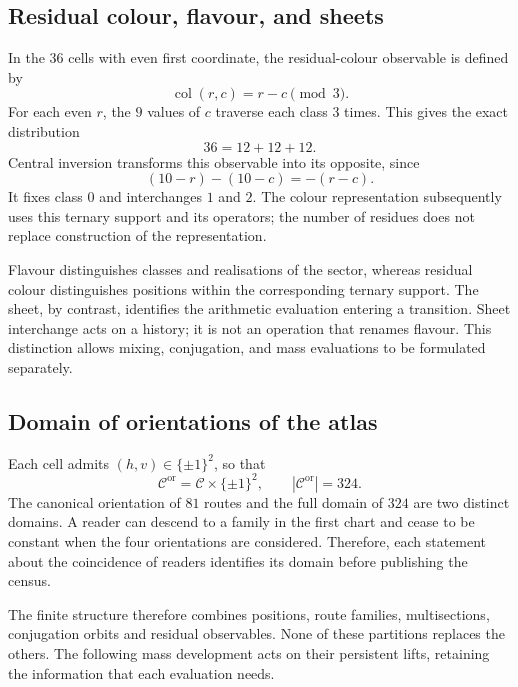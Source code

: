 \subsection{Residual colour, flavour, and sheets}

In the \(36\) cells with even first coordinate, the residual-colour
observable is defined by
\[
 \operatorname{col}(r,c)=r-c\pmod3.
\]
For each even \(r\), the \(9\) values of \(c\) traverse each class
\(3\) times. This gives the exact distribution
\[
 36=12+12+12.
\]
Central inversion transforms this observable into its opposite, since
\[
 (10-r)-(10-c)=-(r-c).
\]
It fixes class \(0\) and interchanges \(1\) and \(2\). The colour
representation subsequently uses this ternary support and its operators;
the number of residues does not replace construction of the representation.

Flavour distinguishes classes and realisations of the sector, whereas residual
colour distinguishes positions within the corresponding ternary support.
The sheet, by contrast, identifies the arithmetic evaluation entering
a transition. Sheet interchange acts on a history; it is not
an operation that renames flavour. This distinction allows
mixing, conjugation, and mass evaluations to be formulated
separately.

\subsection{Domain of orientations of the atlas}

Each cell admits \((h,v)\in\{\pm1\}^2\), so that
\[
 \mathcal C^{\mathrm{or}}=\mathcal C\times\{\pm1\}^2,
 \qquad |\mathcal C^{\mathrm{or}}|=324.
\]
The canonical orientation of \(81\) routes and the full domain of \(324\)
are two distinct domains. A reader can descend to a family in the
first chart and cease to be constant when the four
orientations are considered. Therefore, each statement about the coincidence of readers
identifies its domain before publishing the census.

The finite structure therefore combines positions, route families,
multisections, conjugation orbits and residual observables. None
of these partitions replaces the others. The following mass development
acts on their persistent lifts, retaining the information that
each evaluation needs.
